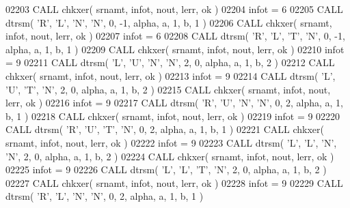 \begin{DoxyCode}
02203       \textcolor{keyword}{CALL }chkxer( srnamt, infot, nout, lerr, ok )
02204       infot = 6
02205       \textcolor{keyword}{CALL }dtrsm( \textcolor{stringliteral}{'R'}, \textcolor{stringliteral}{'L'}, \textcolor{stringliteral}{'N'}, \textcolor{stringliteral}{'N'}, 0, -1, alpha, a, 1, b, 1 )
02206       \textcolor{keyword}{CALL }chkxer( srnamt, infot, nout, lerr, ok )
02207       infot = 6
02208       \textcolor{keyword}{CALL }dtrsm( \textcolor{stringliteral}{'R'}, \textcolor{stringliteral}{'L'}, \textcolor{stringliteral}{'T'}, \textcolor{stringliteral}{'N'}, 0, -1, alpha, a, 1, b, 1 )
02209       \textcolor{keyword}{CALL }chkxer( srnamt, infot, nout, lerr, ok )
02210       infot = 9
02211       \textcolor{keyword}{CALL }dtrsm( \textcolor{stringliteral}{'L'}, \textcolor{stringliteral}{'U'}, \textcolor{stringliteral}{'N'}, \textcolor{stringliteral}{'N'}, 2, 0, alpha, a, 1, b, 2 )
02212       \textcolor{keyword}{CALL }chkxer( srnamt, infot, nout, lerr, ok )
02213       infot = 9
02214       \textcolor{keyword}{CALL }dtrsm( \textcolor{stringliteral}{'L'}, \textcolor{stringliteral}{'U'}, \textcolor{stringliteral}{'T'}, \textcolor{stringliteral}{'N'}, 2, 0, alpha, a, 1, b, 2 )
02215       \textcolor{keyword}{CALL }chkxer( srnamt, infot, nout, lerr, ok )
02216       infot = 9
02217       \textcolor{keyword}{CALL }dtrsm( \textcolor{stringliteral}{'R'}, \textcolor{stringliteral}{'U'}, \textcolor{stringliteral}{'N'}, \textcolor{stringliteral}{'N'}, 0, 2, alpha, a, 1, b, 1 )
02218       \textcolor{keyword}{CALL }chkxer( srnamt, infot, nout, lerr, ok )
02219       infot = 9
02220       \textcolor{keyword}{CALL }dtrsm( \textcolor{stringliteral}{'R'}, \textcolor{stringliteral}{'U'}, \textcolor{stringliteral}{'T'}, \textcolor{stringliteral}{'N'}, 0, 2, alpha, a, 1, b, 1 )
02221       \textcolor{keyword}{CALL }chkxer( srnamt, infot, nout, lerr, ok )
02222       infot = 9
02223       \textcolor{keyword}{CALL }dtrsm( \textcolor{stringliteral}{'L'}, \textcolor{stringliteral}{'L'}, \textcolor{stringliteral}{'N'}, \textcolor{stringliteral}{'N'}, 2, 0, alpha, a, 1, b, 2 )
02224       \textcolor{keyword}{CALL }chkxer( srnamt, infot, nout, lerr, ok )
02225       infot = 9
02226       \textcolor{keyword}{CALL }dtrsm( \textcolor{stringliteral}{'L'}, \textcolor{stringliteral}{'L'}, \textcolor{stringliteral}{'T'}, \textcolor{stringliteral}{'N'}, 2, 0, alpha, a, 1, b, 2 )
02227       \textcolor{keyword}{CALL }chkxer( srnamt, infot, nout, lerr, ok )
02228       infot = 9
02229       \textcolor{keyword}{CALL }dtrsm( \textcolor{stringliteral}{'R'}, \textcolor{stringliteral}{'L'}, \textcolor{stringliteral}{'N'}, \textcolor{stringliteral}{'N'}, 0, 2, alpha, a, 1, b, 1 )

\end{DoxyCode}
